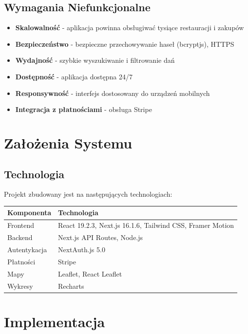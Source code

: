 \documentclass[12pt,a4paper,utf-8]{article}
\begin{document}
\subsection{Wymagania Niefunkcjonalne}

\begin{itemize}
    \item \textbf{Skalowalność} - aplikacja powinna obsługiwać tysiące restauracji i zakupów
    \item \textbf{Bezpieczeństwo} - bezpieczne przechowywanie haseł (bcryptjs), HTTPS
    \item \textbf{Wydajność} - szybkie wyszukiwanie i filtrowanie dań
    \item \textbf{Dostępność} - aplikacja dostępna 24/7
    \item \textbf{Responsywność} - interfejs dostosowany do urządzeń mobilnych
    \item \textbf{Integracja z płatnościami}  -  obsługa Stripe
\end{itemize}

\newpage

\section{Założenia Systemu}

\subsection{Technologia}

Projekt zbudowany jest na następujących technologiach:

\begin{tabularx}{\textwidth}{|l|X|}
    \hline
    \textbf{Komponenta} & \textbf{Technologia} \\
    \hline
    Frontend & React 19.2.3, Next.js 16.1.6, Tailwind CSS, Framer Motion \\
    \hline
    Backend & Next.js API Routes, Node.js \\
    \hline
    Autentykacja & NextAuth.js 5.0 \\
    \hline
    Płatności & Stripe \\
    \hline
    Mapy & Leaflet, React Leaflet \\
    \hline
    Wykresy & Recharts \\
    \hline
\end{tabularx}

\newpage

\section{Implementacja}
\end{document}
